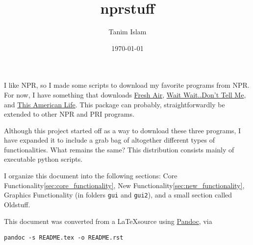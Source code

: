 \documentclass[]{article}
\title{nprstuff}
\date{\today}
\author{Tanim Islam}
\begin{document}
\maketitle

I like NPR, so I made some scripts to download my favorite programs from NPR. For now, I have something that downloads \href{http://www.npr.org/programs/fresh-air/}{Fresh Air}, \href{http://www.npr.org/programs/wait-wait-dont-tell-me/}{Wait Wait..Don't Tell Me}, and \href{http://www.thisamericanlife.org/}{This American Life}. This package can probably, straightforwardly be extended to other NPR and PRI programs.

Although this project started off as a way to download these three programs, I have expanded it to include a grab bag of altogether different types of functionalities. What remains the same? This distribution consists mainly of executable python scripts.

I organize this document into the following sections: Core Functionality\ref{sec:core_functionality}, New Functionality\ref{sec:new_functionality}, Graphics Functionality (in folders {\verb|gui|} and {\verb|gui2|}), and a small section called Oldstuff.

This document was converted from a \LaTeX source using \href{http://pandoc.org/index.html}{Pandoc}, via
\begin{verbatim}
pandoc -s README.tex -o README.rst
\end{verbatim}
\end{document}

